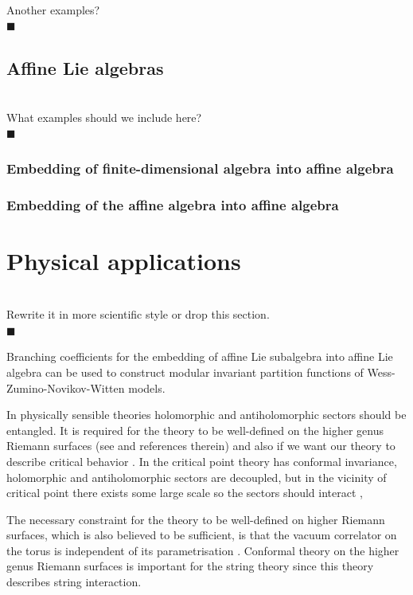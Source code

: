 \documentclass[a4paper,12pt]{article}
\theoremstyle{definition} \newtheorem{Def}{Definition}
\newenvironment{comment}
{\par\noindent{\bf TODO}\\}
{\\\hfill$\scriptstyle\blacksquare$\par}
\begin{document}
\begin{comment}
  Another examples?
\end{comment}
\subsection{Affine Lie algebras}
\label{sec:affine-lie-algebras}
\begin{comment}
  What examples should we include here?
\end{comment}
\subsubsection{Embedding of finite-dimensional algebra into affine algebra}
\label{sec:embedd-finite-dimens}

\subsubsection{Embedding of the affine algebra into affine algebra}
\label{sec:embedd-affine-algebr}

\section{Physical applications}
\label{sec:phys-appl}
\begin{comment}
  Rewrite it in more scientific style or drop this section.
\end{comment}
Branching coefficients for the embedding of affine Lie subalgebra into
affine Lie algebra can be used to construct modular invariant
partition functions of Wess-Zumino-Novikov-Witten models.

 In physically sensible theories holomorphic and antiholomorphic
 sectors should be entangled. It is required for the theory to be
 well-defined on the higher genus Riemann surfaces (see
 \cite{gaberdiel2000icf} and references therein) and also if we want
 our theory to describe critical behavior \cite{difrancesco1997cft}.
 In the critical point theory has conformal invariance, holomorphic
 and antiholomorphic sectors are decoupled, but in the vicinity of
 critical point there exists some large scale so the sectors should
 interact \cite{difrancesco1997cft}, 

The necessary constraint for the theory to be well-defined on higher Riemann surfaces, which is also believed to be sufficient, is that the vacuum correlator on the torus is independent of its parametrisation \cite{gaberdiel2000icf}. Conformal theory on the higher genus Riemann surfaces is important for the string theory since this theory describes string interaction.
\end{document}
